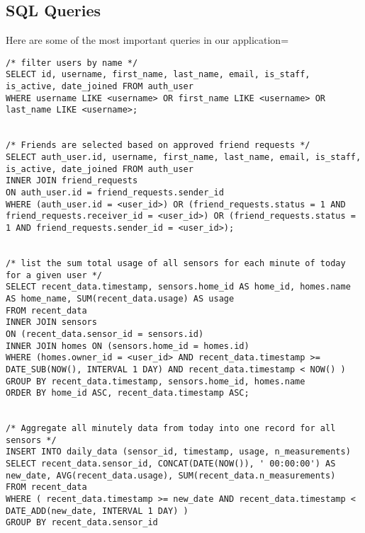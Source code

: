 \documentclass[11pt]{article}
\begin{document}
  \subsection{SQL Queries}
  Here are some of the most important queries in our application=
\begin{lstlisting}[style=SQL]
/* filter users by name */
SELECT id, username, first_name, last_name, email, is_staff, is_active, date_joined FROM auth_user
WHERE username LIKE <username> OR first_name LIKE <username> OR last_name LIKE <username>;


/* Friends are selected based on approved friend requests */
SELECT auth_user.id, username, first_name, last_name, email, is_staff, is_active, date_joined FROM auth_user
INNER JOIN friend_requests
ON auth_user.id = friend_requests.sender_id
WHERE (auth_user.id = <user_id>) OR (friend_requests.status = 1 AND friend_requests.receiver_id = <user_id>) OR (friend_requests.status = 1 AND friend_requests.sender_id = <user_id>);


/* list the sum total usage of all sensors for each minute of today for a given user */
SELECT recent_data.timestamp, sensors.home_id AS home_id, homes.name AS home_name, SUM(recent_data.usage) AS usage
FROM recent_data
INNER JOIN sensors
ON (recent_data.sensor_id = sensors.id)
INNER JOIN homes ON (sensors.home_id = homes.id)
WHERE (homes.owner_id = <user_id> AND recent_data.timestamp >= DATE_SUB(NOW(), INTERVAL 1 DAY) AND recent_data.timestamp < NOW() )
GROUP BY recent_data.timestamp, sensors.home_id, homes.name
ORDER BY home_id ASC, recent_data.timestamp ASC;


/* Aggregate all minutely data from today into one record for all sensors */
INSERT INTO daily_data (sensor_id, timestamp, usage, n_measurements)
SELECT recent_data.sensor_id, CONCAT(DATE(NOW()), ' 00:00:00') AS new_date, AVG(recent_data.usage), SUM(recent_data.n_measurements)
FROM recent_data
WHERE ( recent_data.timestamp >= new_date AND recent_data.timestamp < DATE_ADD(new_date, INTERVAL 1 DAY) )
GROUP BY recent_data.sensor_id
\end{lstlisting}
\end{document}
